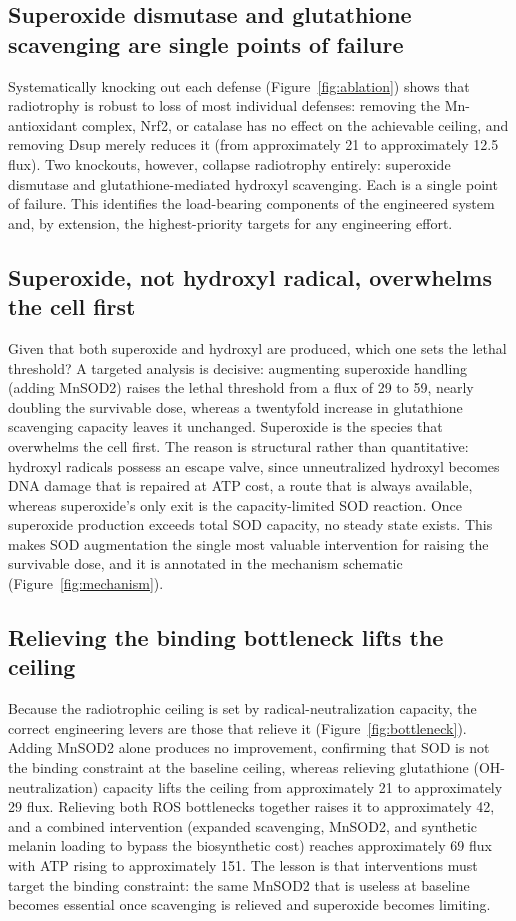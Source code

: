 \documentclass[11pt]{article}
\begin{document}
\subsection{Superoxide dismutase and glutathione scavenging are single points of
failure}

Systematically knocking out each defense (Figure~\ref{fig:ablation}) shows that
radiotrophy is robust to loss of most individual defenses: removing the
Mn-antioxidant complex, Nrf2, or catalase has no effect on the achievable ceiling,
and removing Dsup merely reduces it (from approximately 21 to approximately 12.5
flux). Two knockouts, however, collapse radiotrophy entirely: superoxide dismutase
and glutathione-mediated hydroxyl scavenging. Each is a single point of failure.
This identifies the load-bearing components of the engineered system and, by
extension, the highest-priority targets for any engineering effort.

\subsection{Superoxide, not hydroxyl radical, overwhelms the cell first}

Given that both superoxide and hydroxyl are produced, which one sets the lethal
threshold? A targeted analysis is decisive: augmenting superoxide handling (adding
MnSOD2) raises the lethal threshold from a flux of 29 to 59, nearly doubling the
survivable dose, whereas a twentyfold increase in glutathione scavenging capacity
leaves it unchanged. Superoxide is the species that overwhelms the cell first. The
reason is structural rather than quantitative: hydroxyl radicals possess an escape
valve, since unneutralized hydroxyl becomes DNA damage that is repaired at ATP
cost, a route that is always available, whereas superoxide's only exit is the
capacity-limited SOD reaction. Once superoxide production exceeds total SOD
capacity, no steady state exists. This makes SOD augmentation the single most
valuable intervention for raising the survivable dose, and it is annotated in the
mechanism schematic (Figure~\ref{fig:mechanism}).

\subsection{Relieving the binding bottleneck lifts the ceiling}

Because the radiotrophic ceiling is set by radical-neutralization capacity, the
correct engineering levers are those that relieve it (Figure~\ref{fig:bottleneck}).
Adding MnSOD2 alone produces no improvement, confirming that SOD is not the binding
constraint at the baseline ceiling, whereas relieving glutathione (OH-neutralization)
capacity lifts the ceiling from approximately 21 to approximately 29 flux.
Relieving both ROS bottlenecks together raises it to approximately 42, and a
combined intervention (expanded scavenging, MnSOD2, and synthetic melanin loading
to bypass the biosynthetic cost) reaches approximately 69 flux with ATP rising to
approximately 151. The lesson is that interventions must target the binding
constraint: the same MnSOD2 that is useless at baseline becomes essential once
scavenging is relieved and superoxide becomes limiting.
\end{document}
